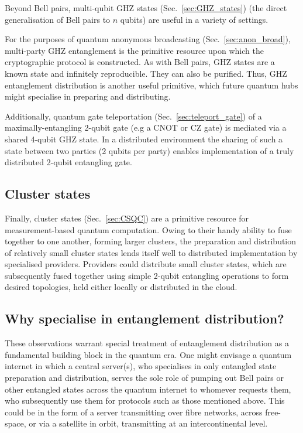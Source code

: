 Beyond Bell pairs, multi-qubit GHZ states (Sec.~\ref{sec:GHZ_states}) (the direct generalisation of Bell pairs to $n$ qubits) are useful in a variety of settings.

For the purposes of quantum anonymous broadcasting (Sec.~\ref{sec:anon_broad}), multi-party GHZ entanglement is the primitive resource upon which the cryptographic protocol is constructed. As with Bell pairs, GHZ states are a known state and infinitely reproducible. They can also be purified. Thus, GHZ entanglement distribution is another useful primitive, which future quantum hubs might specialise in preparing and distributing.

Additionally, quantum gate teleportation (Sec.~\ref{sec:teleport_gate}) of a maximally-entangling 2-qubit gate (e.g a CNOT or CZ gate) is mediated via a shared 4-qubit GHZ state. In a distributed environment the sharing of such a state between two parties (2 qubits per party) enables implementation of a truly distributed 2-qubit entangling gate.

%
%

\subsection{Cluster states}

Finally, cluster states (Sec.~\ref{sec:CSQC}) are a primitive resource for measurement-based quantum computation. Owing to their handy ability to fuse together to one another, forming larger clusters, the preparation and distribution of relatively small cluster states lends itself well to distributed implementation by specialised providers. Providers could distribute small cluster states, which are subsequently fused together using simple 2-qubit entangling operations to form desired topologies, held either locally or distributed in the cloud.

%
%

\subsection{Why specialise in entanglement distribution?}

These observations warrant special treatment of entanglement distribution as a fundamental building block in the quantum era. One might envisage a quantum internet in which a central server(s), who specialises in only entangled state preparation and distribution, serves the sole role of pumping out Bell pairs or other entangled states across the quantum internet to whomever requests them, who subsequently use them for protocols such as those mentioned above. This could be in the form of a server transmitting over fibre networks, across free-space, or via a satellite in orbit, transmitting at an intercontinental level.

